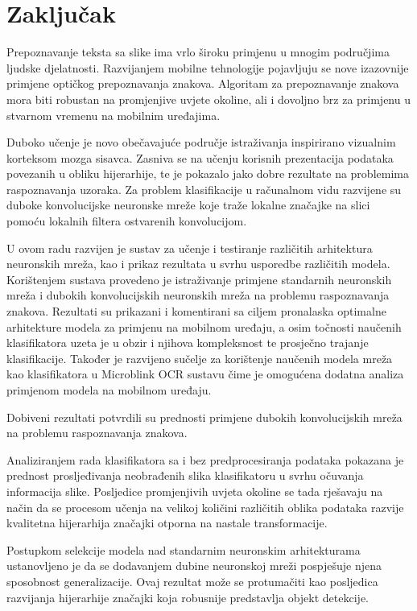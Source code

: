 \documentclass[lmodern, utf8, diplomski, numeric]{fer}
\begin{document}
\chapter{Zaključak}

Prepoznavanje teksta sa slike ima vrlo široku primjenu u mnogim područjima ljudske djelatnosti. Razvijanjem mobilne tehnologije pojavljuju se nove izazovnije primjene optičkog prepoznavanja znakova. Algoritam za prepoznavanje znakova mora biti robustan na promjenjive uvjete okoline, ali i dovoljno brz za primjenu u stvarnom vremenu na mobilnim uređajima. 

Duboko učenje je novo obečavajuće područje istraživanja inspirirano vizualnim korteksom mozga sisavca. Zasniva se na učenju korisnih prezentacija podataka povezanih u obliku hijerarhije, te je pokazalo jako dobre rezultate na problemima raspoznavanja uzoraka. Za problem klasifikacije u računalnom vidu razvijene su duboke konvolucijske neuronske mreže koje traže lokalne značajke na slici pomoću lokalnih filtera ostvarenih konvolucijom. 

U ovom radu razvijen je sustav za učenje i testiranje različitih arhitektura neuronskih mreža, kao i prikaz rezultata u svrhu usporedbe različitih modela. Korištenjem sustava provedeno je istraživanje primjene standarnih neuronskih mreža i dubokih konvolucijskih neuronskih mreža na problemu raspoznavanja znakova. Rezultati su prikazani i komentirani sa ciljem pronalaska optimalne arhitekture modela za primjenu na mobilnom uređaju, a osim točnosti naučenih klasifikatora uzeta je u obzir i njihova kompleksnost te prosječno trajanje klasifikacije. Također je razvijeno sučelje za korištenje naučenih modela mreža kao klasifikatora u Microblink OCR sustavu čime je omogućena dodatna analiza primjenom modela na mobilnom uređaju.

Dobiveni rezultati potvrdili su prednosti primjene dubokih konvolucijskih mreža na problemu raspoznavanja znakova. 

Analiziranjem rada klasifikatora sa i bez predprocesiranja podataka pokazana je prednost prosljeđivanja neobrađenih slika klasifikatoru u svrhu očuvanja informacija slike. Posljedice promjenjivih uvjeta okoline se tada rješavaju na način da se procesom učenja na velikoj količini različitih oblika podataka razvije kvalitetna hijerarhija značajki otporna na nastale transformacije.

Postupkom selekcije modela nad standarnim neuronskim arhitekturama ustanovljeno je da se dodavanjem dubine neuronskoj mreži pospješuje njena sposobnost generalizacije. Ovaj rezultat može se protumačiti kao posljedica razvijanja hijerarhije značajki koja robusnije predstavlja objekt detekcije. 
\end{document}
